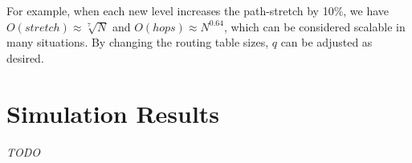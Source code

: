 \documentclass[14pt]{extarticle}
\theoremstyle{definition}
\begin{document}
For example, when each new level increases the path-stretch by 10\%, we have \mbox{$ O(stretch) \approx \sqrt[7]{N} $} and $O(hops) \approx N^{0.64}$, which can be considered scalable in many situations. By changing the routing table sizes, $q$ can be adjusted as desired.


\section{Simulation Results}

\emph{TODO}




\end{document}

